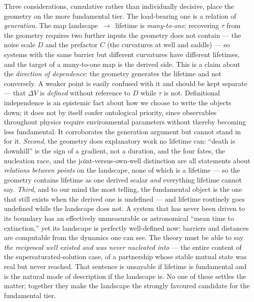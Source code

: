 \documentclass[11pt]{article}
\theoremstyle{plain}
\theoremstyle{definition}
\begin{document}
Three considerations, cumulative rather than individually decisive, place the geometry on the more fundamental tier. The load-bearing one is a relation of \emph{generation}. The map landscape~$\to$~lifetime is \emph{many-to-one}: recovering $\tau$ from the geometry requires two further inputs the geometry does not contain --- the noise scale $D$ and the prefactor $C$ (the curvatures at well and saddle) --- so systems with the same barrier but different curvatures have different lifetimes, and the target of a many-to-one map is the derived side. This is a claim about the \emph{direction of dependence}: the geometry generates the lifetime and not conversely. A weaker point is easily confused with it and should be kept separate --- that $\Delta V$ is \emph{defined} without reference to $D$ while $\tau$ is not. Definitional independence is an epistemic fact about how we choose to write the objects down; it does not by itself confer ontological priority, since observables throughout physics require environmental parameters without thereby becoming less fundamental. It corroborates the generation argument but cannot stand in for it. \emph{Second}, the geometry does explanatory work no lifetime can: ``death is downhill'' is the sign of a gradient, not a duration, and the four fates, the nucleation race, and the joint-versus-own-well distinction are all statements about \emph{relations between points} on the landscape, none of which is a lifetime --- so the geometry contains lifetime as one derived scalar \emph{and} everything lifetime cannot say. \emph{Third}, and to our mind the most telling, the fundamental object is the one that still exists when the derived one is undefined --- and lifetime routinely goes undefined while the landscape does not. A system that has never been driven to its boundary has an effectively unmeasurable or astronomical ``mean time to extinction,'' yet its landscape is perfectly well-defined now: barriers and distances are computable from the dynamics one can see. The theory must be able to say \emph{the reciprocal well existed and was never nucleated into} --- the entire content of the supersaturated-solution case, of a partnership whose stable mutual state was real but never reached. That sentence is unsayable if lifetime is fundamental and is the natural mode of description if the landscape is. No one of these settles the matter; together they make the landscape the strongly favoured candidate for the fundamental tier.
\end{document}
